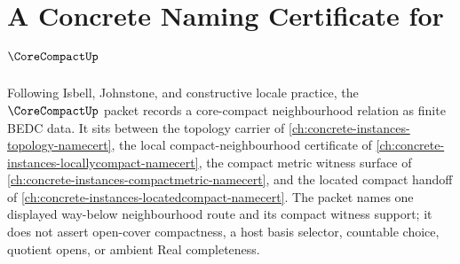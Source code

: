 \chapter{A Concrete Naming Certificate for $\CoreCompactUp$}
\label{ch:concrete-instances-core-compact-namecert}

Following Isbell, Johnstone, and constructive locale practice, the $\CoreCompactUp$ packet records a core-compact neighbourhood relation as finite BEDC data. It sits between the topology carrier of \autoref{ch:concrete-instances-topology-namecert}, the local compact-neighbourhood certificate of \autoref{ch:concrete-instances-locallycompact-namecert}, the compact metric witness surface of \autoref{ch:concrete-instances-compactmetric-namecert}, and the located compact handoff of \autoref{ch:concrete-instances-locatedcompact-namecert}. The packet names one displayed way-below neighbourhood route and its compact witness support; it does not assert open-cover compactness, a host basis selector, countable choice, quotient opens, or ambient Real completeness.

